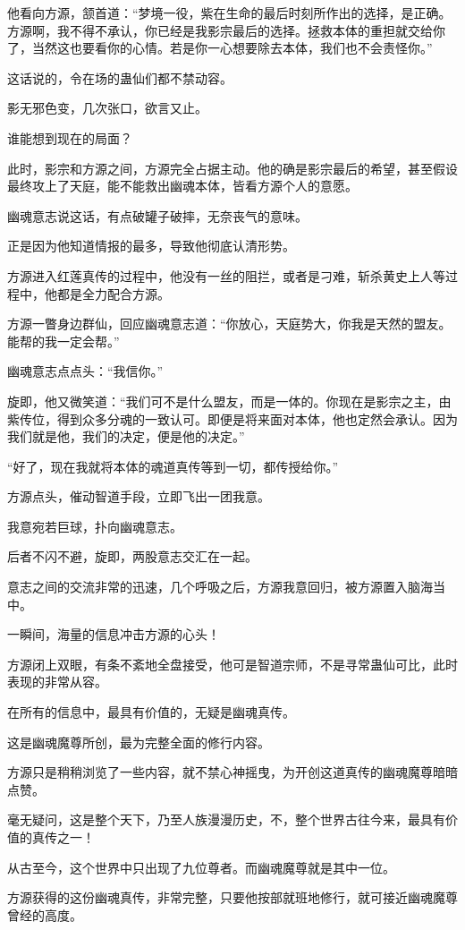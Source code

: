 \begin{this_body}
他看向方源，颔首道：“梦境一役，紫在生命的最后时刻所作出的选择，是正确。方源啊，我不得不承认，你已经是我影宗最后的选择。拯救本体的重担就交给你了，当然这也要看你的心情。若是你一心想要除去本体，我们也不会责怪你。”

这话说的，令在场的蛊仙们都不禁动容。

影无邪色变，几次张口，欲言又止。

谁能想到现在的局面？

此时，影宗和方源之间，方源完全占据主动。他的确是影宗最后的希望，甚至假设最终攻上了天庭，能不能救出幽魂本体，皆看方源个人的意愿。

幽魂意志说这话，有点破罐子破摔，无奈丧气的意味。

正是因为他知道情报的最多，导致他彻底认清形势。

方源进入红莲真传的过程中，他没有一丝的阻拦，或者是刁难，斩杀黄史上人等过程中，他都是全力配合方源。

方源一瞥身边群仙，回应幽魂意志道：“你放心，天庭势大，你我是天然的盟友。能帮的我一定会帮。”

幽魂意志点点头：“我信你。”

旋即，他又微笑道：“我们可不是什么盟友，而是一体的。你现在是影宗之主，由紫传位，得到众多分魂的一致认可。即便是将来面对本体，他也定然会承认。因为我们就是他，我们的决定，便是他的决定。”

“好了，现在我就将本体的魂道真传等到一切，都传授给你。”

方源点头，催动智道手段，立即飞出一团我意。

我意宛若巨球，扑向幽魂意志。

后者不闪不避，旋即，两股意志交汇在一起。

意志之间的交流非常的迅速，几个呼吸之后，方源我意回归，被方源置入脑海当中。

一瞬间，海量的信息冲击方源的心头！

方源闭上双眼，有条不紊地全盘接受，他可是智道宗师，不是寻常蛊仙可比，此时表现的非常从容。

在所有的信息中，最具有价值的，无疑是幽魂真传。

这是幽魂魔尊所创，最为完整全面的修行内容。

方源只是稍稍浏览了一些内容，就不禁心神摇曳，为开创这道真传的幽魂魔尊暗暗点赞。

毫无疑问，这是整个天下，乃至人族漫漫历史，不，整个世界古往今来，最具有价值的真传之一！

从古至今，这个世界中只出现了九位尊者。而幽魂魔尊就是其中一位。

方源获得的这份幽魂真传，非常完整，只要他按部就班地修行，就可接近幽魂魔尊曾经的高度。


\end{this_body}

